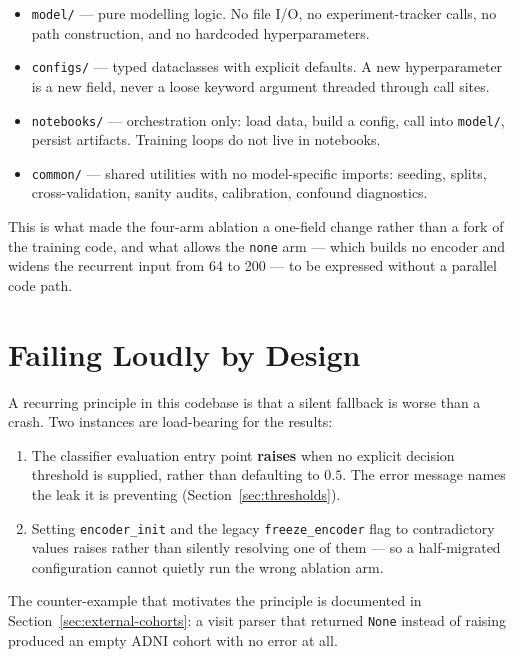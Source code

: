 \begin{itemize}
  \item \texttt{model/} --- pure modelling logic. No file I/O, no experiment-tracker calls,
    no path construction, and no hardcoded hyperparameters.
  \item \texttt{configs/} --- typed dataclasses with explicit defaults. A new
    hyperparameter is a new field, never a loose keyword argument threaded through call
    sites.
  \item \texttt{notebooks/} --- orchestration only: load data, build a config, call into
    \texttt{model/}, persist artifacts. Training loops do not live in notebooks.
  \item \texttt{common/} --- shared utilities with no model-specific imports: seeding,
    splits, cross-validation, sanity audits, calibration, confound diagnostics.
\end{itemize}

This is what made the four-arm ablation a one-field change rather than a fork of the
training code, and what allows the \texttt{none} arm --- which builds no encoder and widens
the recurrent input from 64 to 200 --- to be expressed without a parallel code path.

\section{Failing Loudly by Design}
\label{sec:fail-loud}

A recurring principle in this codebase is that a silent fallback is worse than a crash. Two
instances are load-bearing for the results:

\begin{enumerate}
  \item The classifier evaluation entry point \textbf{raises} when no explicit decision
    threshold is supplied, rather than defaulting to $0.5$. The error message names the leak
    it is preventing (Section~\ref{sec:thresholds}).
  \item Setting \texttt{encoder\_init} and the legacy \texttt{freeze\_encoder} flag to
    contradictory values raises rather than silently resolving one of them --- so a
    half-migrated configuration cannot quietly run the wrong ablation arm.
\end{enumerate}

The counter-example that motivates the principle is documented in
Section~\ref{sec:external-cohorts}: a visit parser that returned \texttt{None} instead of
raising produced an empty ADNI cohort with no error at all.

